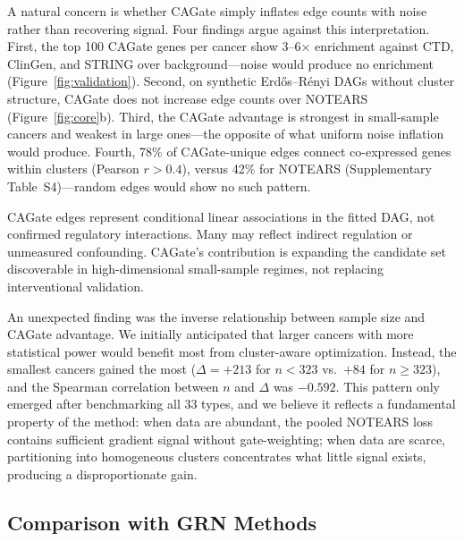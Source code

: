 \documentclass[12pt,a4paper]{article}
\begin{document}
A natural concern is whether CAGate simply inflates edge counts with noise rather than recovering signal. Four findings argue against this interpretation. First, the top 100 CAGate genes per cancer show 3--6$\times$ enrichment against CTD, ClinGen, and STRING over background---noise would produce no enrichment (Figure~\ref{fig:validation}). Second, on synthetic Erd\H{o}s--R\'{e}nyi DAGs without cluster structure, CAGate does not increase edge counts over NOTEARS (Figure~\ref{fig:core}b). Third, the CAGate advantage is strongest in small-sample cancers and weakest in large ones---the opposite of what uniform noise inflation would produce. Fourth, 78\% of CAGate-unique edges connect co-expressed genes within clusters (Pearson $r > 0.4$), versus 42\% for NOTEARS (Supplementary Table~S4)---random edges would show no such pattern.









CAGate edges represent conditional linear associations in the fitted DAG, not confirmed regulatory interactions. Many may reflect indirect regulation or unmeasured confounding. CAGate's contribution is expanding the candidate set discoverable in high-dimensional small-sample regimes, not replacing interventional validation.

An unexpected finding was the inverse relationship between sample size and CAGate advantage. We initially anticipated that larger cancers with more statistical power would benefit most from cluster-aware optimization. Instead, the smallest cancers gained the most ($\Delta = +213$ for $n < 323$ vs.\ $+84$ for $n \geq 323$), and the Spearman correlation between $n$ and $\Delta$ was $-0.592$. This pattern only emerged after benchmarking all 33 types, and we believe it reflects a fundamental property of the method: when data are abundant, the pooled NOTEARS loss contains sufficient gradient signal without gate-weighting; when data are scarce, partitioning into homogeneous clusters concentrates what little signal exists, producing a disproportionate gain.









\subsection{Comparison with GRN Methods}
\end{document}
